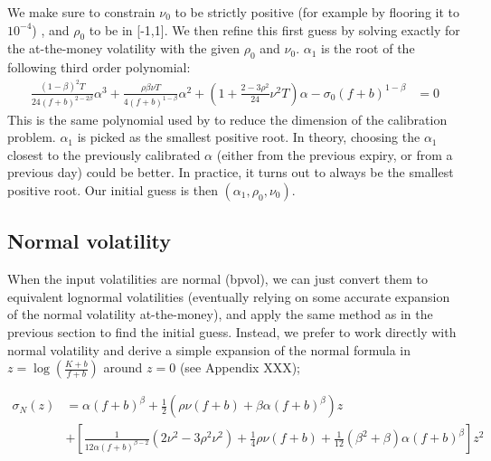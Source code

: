 \documentclass[]{rAMF2e}
\begin{document}
We make sure to constrain $\nu_0$ to be strictly positive (for example by flooring it to $10^{-4}$) , and $\rho_0$ to be in [-1,1]. We then refine this first guess by solving exactly for the at-the-money volatility with the given $\rho_0$ and $\nu_0$. $\alpha_1$ is the root of the following third order polynomial:
\begin{align}
\frac{(1-\beta)^2 T}{24 (f+b)^{2-2\beta}}\alpha^3+ \frac{\rho\beta\nu T}{4(f+b)^{1-\beta}}\alpha^2 + \left(1+\frac{2-3\rho^2}{24}\nu^2 T\right)\alpha - \sigma_0 (f+b)^{1-\beta} &= 0
\end{align}
This is the same polynomial used by \citet{west2005calibration} to reduce the dimension of the calibration problem. $\alpha_1$ is picked as the smallest positive root. In theory, choosing the $\alpha_1$ closest to the previously calibrated $\alpha$ (either from the previous expiry, or from a previous day) could be better. In practice, it turns out to always be the smallest positive root. 
Our initial guess is then $(\alpha_1, \rho_0, \nu_0)$.
\subsection{Normal volatility}
When the input volatilities are normal (bpvol), we can just convert them to equivalent lognormal volatilities (eventually relying on some accurate expansion of the normal volatility at-the-money), and apply the same method as in the previous section to find the initial guess. Instead, we prefer to work directly with normal volatility and derive a simple expansion of the normal formula in $z=\log\left(\frac{K+b}{f+b}\right)$ around $z=0$ (see Appendix XXX);

\begin{align}
\sigma_N(z) &= \alpha (f+b)^\beta + \frac{1}{2}\left(\rho \nu (f+b)+\beta \alpha (f+b)^\beta \right)z\\
&+ \left[\frac{1}{12\alpha (f+b)^{\beta-2}}(2\nu^2-3\rho^2 \nu^2)+\frac{1}{4} \rho \nu (f+b)+\frac{1}{12}(\beta^2+\beta)\alpha (f+b)^\beta \right]z^2
\end{align}
\end{document}
